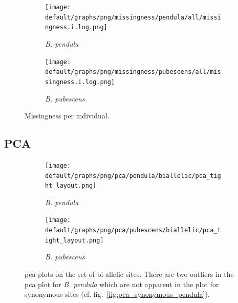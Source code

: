 \documentclass[hidelinks,11pt]{article}
\newcommand{\pendula}{\textit{B. pendula}}
\newcommand{\pubescens}{\textit{B. pubescens}}
\begin{document}
    \begin{figure}[H]
        \centering
        \begin{subfigure}[b]{0.49\textwidth}
            \centering
            \texttt{[image: default/graphs/png/missingness/pendula/all/missingness.i.log.png]}
            \caption{\pendula{}}
        \end{subfigure}
        \hfill
        \begin{subfigure}[b]{0.49\textwidth}
            \centering
            \texttt{[image: default/graphs/png/missingness/pubescens/all/missingness.i.log.png]}
            \caption{\pubescens{}}
        \end{subfigure}
        \caption{Missingness per individual.}
        \label{fig:missingness-individual}
    \end{figure}

    \clearpage

    \subsection{PCA}
    \label{sec:appendix-pca}

    \begin{figure}[H]
        \centering
        \begin{subfigure}[b]{0.49\textwidth}
            \centering
            \texttt{[image: default/graphs/png/pca/pendula/biallelic/pca\_tight\_layout.png]}
            \caption{\pendula{}}
            \label{fig:pca_pendula}
        \end{subfigure}
        \hfill
        \begin{subfigure}[b]{0.501\textwidth}
            \centering
            \texttt{[image: default/graphs/png/pca/pubescens/biallelic/pca\_tight\_layout.png]}
            \caption{\pubescens{}}
            \label{fig:pca_pubescens}
        \end{subfigure}
        \caption{\acrshort{pca} plots on the set of bi-allelic sites. There are two outliers in the \acrshort{pca} plot for \pendula{} which are not apparent in the plot for synonymous sites (cf. fig.~\ref{fig:pca_synonymous_pendula}).}
        \label{fig:pca_pendula_pubescens_separate}
    \end{figure}
\end{document}
